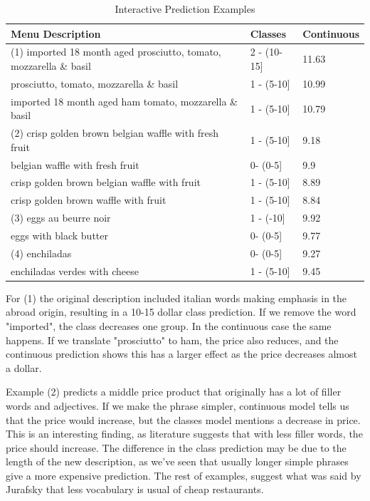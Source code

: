 \documentclass[11pt,letterpaper]{article}
\begin{document}
\begin{table}[ht!]
\centering
\caption{Interactive Prediction Examples}
\label{table:interactive}
\scalebox{0.8} 
{\begin{tabular}{|l|l|l|}
\hline
\textbf{Menu Description} & \textbf{Classes} & \textbf{Continuous} \\ \hline \hline
(1) imported 18 month aged prosciutto, tomato, mozzarella \& basil & 2 - (10-15{]} & 11.63 \\ \hline
prosciutto, tomato, mozzarella \& basil & 1 - (5-10{]} & 10.99 \\ \hline
imported 18 month aged ham tomato, mozzarella \& basil & 1 - (5-10{]} & 10.79 \\ \hline \hline
(2) crisp golden brown belgian waffle with fresh fruit & 1 - (5-10{]} & 9.18 \\ \hline
belgian waffle with fresh fruit & 0- (0-5{]} & 9.9 \\ \hline
crisp golden brown belgian waffle with fruit & 1 - (5-10{]} & 8.89 \\ \hline
crisp golden brown  waffle with fruit & 1 - (5-10{]} & 8.84 \\ \hline \hline
(3) eggs au beurre noir & 1 - (-10{]} & 9.92 \\ \hline
eggs with black butter & 0- (0-5{]} & 9.77 \\ \hline \hline
(4) enchiladas & 0- (0-5{]} & 9.27 \\ \hline
enchiladas verdes with cheese & 1 - (5-10{]} & 9.45 \\ \hline \hline
\end{tabular}}
\end{table}

For (1) the original description included italian words making emphasis in the abroad origin, resulting in a 10-15 dollar class prediction. If we remove the word "imported", the class decreases one group. In the continuous case the same happens. If we translate "prosciutto" to ham, the price also reduces, and the continuous prediction shows this has a larger effect as the price decreases almost a dollar.

Example (2) predicts a middle price product that originally has a lot of filler words and adjectives. If we make the phrase simpler, continuous model tells us that the price would increase, but the classes model mentions a decrease in price. This is an interesting finding, as literature suggests that with less filler words, the price should increase. The difference in the class prediction may be due to the length of the new description, as we've seen that usually longer simple phrases give a more expensive prediction. The rest of examples, suggest what was said by Jurafsky that less vocabulary is usual of cheap restaurants. 
\end{document}
